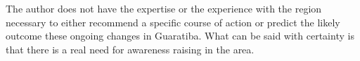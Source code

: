 The author does not have the expertise or the experience with the region necessary to either recommend a specific course of action or predict the likely outcome these ongoing changes in Guaratiba. What can be said with certainty is that there is a real need for awareness raising in the area.

\section{}






